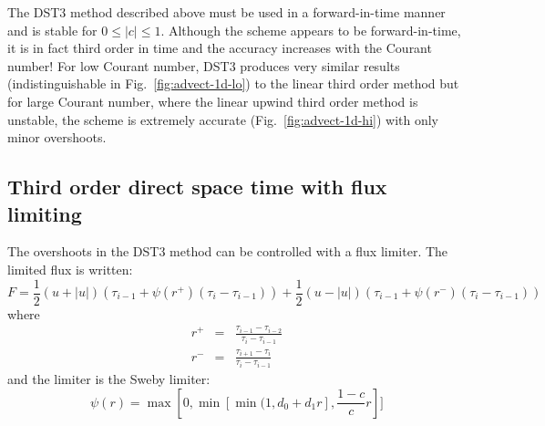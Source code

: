 The DST3 method described above must be used in a forward-in-time
manner and is stable for $0 \le |c| \le 1$. Although the scheme
appears to be forward-in-time, it is in fact third order in time and
the accuracy increases with the Courant number! For low Courant
number, DST3 produces very similar results (indistinguishable in
Fig.~\ref{fig:advect-1d-lo}) to the linear third order method but for
large Courant number, where the linear upwind third order method is
unstable, the scheme is extremely accurate
(Fig.~\ref{fig:advect-1d-hi}) with only minor overshoots.



\subsection{Third order direct space time with flux limiting}

The overshoots in the DST3 method can be controlled with a flux limiter.
The limited flux is written:
\begin{equation}
F =
\frac{1}{2}(u+|u|)\left( \tau_{i-1} + \psi(r^+)(\tau_{i} - \tau_{i-1} )\right)
+
\frac{1}{2}(u-|u|)\left( \tau_{i-1} + \psi(r^-)(\tau_{i} - \tau_{i-1} )\right)
\end{equation}
where
\begin{eqnarray}
r^+ & = & \frac{\tau_{i-1} - \tau_{i-2}}{\tau_{i} - \tau_{i-1}} \\
r^- & = & \frac{\tau_{i+1} - \tau_{i}}{\tau_{i} - \tau_{i-1}}
\end{eqnarray}
and the limiter is the Sweby limiter:
\begin{equation}
\psi(r) = \max[0, \min[\min(1,d_0+d_1r],\frac{1-c}{c}r ]]
\end{equation}

